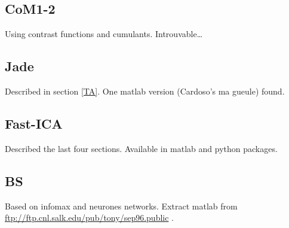 \documentclass[a4paper,11pt,titlepage]{article}
\begin{document}
\subsection{CoM1-2}
Using contrast functions and cumulants. Introuvable\dots
\subsection{Jade}
Described in section \ref{TA}. One matlab version (Cardoso's ma gueule) found.
\subsection{Fast-ICA}
Described the last four sections. Available in matlab and python packages.
\subsection{BS}
Based on infomax and neurones networks. Extract matlab from \\\url{ftp://ftp.cnl.salk.edu/pub/tony/sep96.public} .
\end{document}
